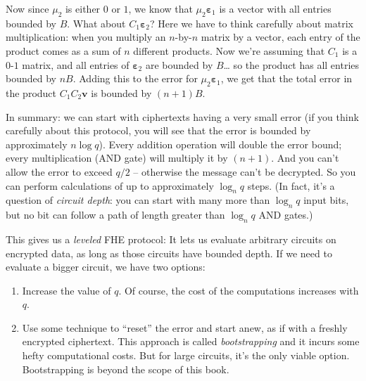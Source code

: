 Now since $\mu_{2}$ is either $0$ or $1$, we know that
$\mu_{2}\mathbf{\varepsilon}_{1}$ is a vector with all entries bounded
by $B$. What about $C_{1}\mathbf{\varepsilon}_{2}$? Here we have to
think carefully about matrix multiplication: when you multiply an
$n$-by-$n$ matrix by a vector, each entry of the product comes as a
sum of $n$ different products. Now we're assuming that $C_{1}$ is a
$0$-$1$ matrix, and all entries of $\mathbf{\varepsilon}_{2}$ are
bounded by $B$\ldots{} so the product has all entries bounded by
$nB$. Adding this to the error for
$\mu_{2}\mathbf{\varepsilon}_{1}$, we get that the total error in the
product $C_{1}C_{2}\mathbf{v}$ is bounded by $(n + 1)B$.

In summary: we can start with ciphertexts having a very small error (if
you think carefully about this protocol, you will see that the error is
bounded by approximately $n\log q$). Every addition operation will
double the error bound; every multiplication (AND gate) will multiply it
by $(n + 1)$. And you can't allow the error to exceed $q/2$ --
otherwise the message can't be decrypted. So you can perform
calculations of up to approximately $\log_{n}q$ steps. (In fact, it's
a question of \emph{circuit depth}: you can start with many more than
$\log_{n}q$ input bits, but no bit can follow a path of length greater
than $\log_{n}q$ AND gates.)

This gives us a \emph{leveled} FHE protocol: It lets us evaluate
arbitrary circuits on encrypted data, as long as those circuits have
bounded depth. If we need to evaluate a bigger circuit, we have two
options:

\begin{enumerate}
\item
  Increase the value of $q$. Of course, the cost of the computations
  increases with $q$.
\item
  Use some technique to ``reset'' the error and start anew, as if with a
  freshly encrypted ciphertext. This approach is called
  \emph{bootstrapping} and it incurs some hefty computational costs. But
  for large circuits, it's the only viable option. Bootstrapping is
  beyond the scope of this book.
\end{enumerate}
